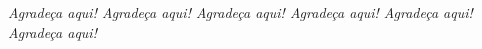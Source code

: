 \begin{agradecimentos}

\textit{Agradeça aqui! Agradeça aqui! Agradeça aqui! Agradeça aqui! Agradeça aqui! Agradeça aqui!}




\end{agradecimentos}